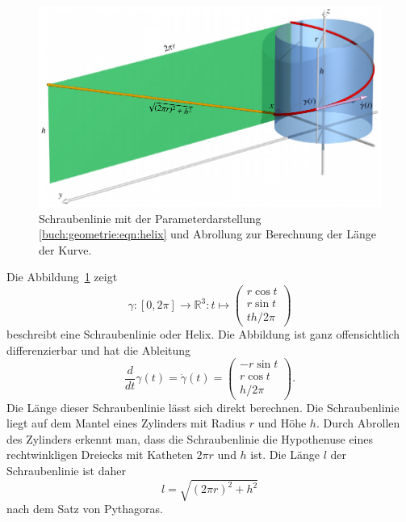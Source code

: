 \begin{beispiel}
\begin{figure}
\centering
\includegraphics[width=\textwidth]{chapters/030-geometrie/images/zylinder.pdf}
\caption{Schraubenlinie mit der Parameterdarstellung
\eqref{buch:geometrie:eqn:helix} und Abrollung zur Berechnung der
Länge der Kurve.
\label{buch:geometrie:fig:zylinder}}
\end{figure}
Die Abbildung~\ref{buch:geometrie:fig:zylinder} zeigt 
\begin{equation}
\gamma
\colon
[0,2\pi] \to \mathbb{R}^3
:
t\mapsto\begin{pmatrix}r\cos t\\ r\sin t\\ th/2\pi\end{pmatrix}
\label{buch:geometrie:eqn:helix}
\end{equation}
beschreibt eine Schraubenlinie oder Helix.
%
%
Die Abbildung ist ganz offensichtlich differenzierbar und hat die
Ableitung
\begin{equation}
\frac{d}{dt}\gamma(t)
=
\dot{\gamma}(t)
=
\begin{pmatrix} -r\sin t \\ r\cos t \\ h/2\pi\end{pmatrix}.
\label{buch:geometrie:eqn:helixdot}
\end{equation}
Die Länge dieser Schraubenlinie lässt sich direkt berechnen.
Die Schraubenlinie liegt auf dem Mantel eines Zylinders mit
Radius $r$ und Höhe $h$.
Durch Abrollen des Zylinders erkennt man, dass die Schraubenlinie
die Hypothenuse eines rechtwinkligen Dreiecks mit Katheten 
$2\pi r$ und $h$ ist.
Die Länge $l$ der Schraubenlinie ist daher
\begin{equation}
l = \sqrt{(2\pi r)^2 +h^2}
\label{buch:geometrie:eqn:helixlaenge}
\end{equation}
nach dem Satz von Pythagoras.
\end{beispiel}

